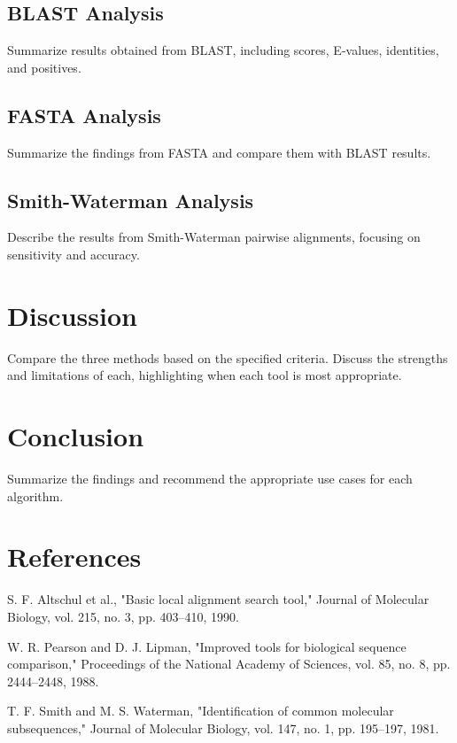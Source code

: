 \documentclass[a4paper,12pt]{article}
\begin{document}
\subsection{BLAST Analysis}
Summarize results obtained from BLAST, including scores, E-values, identities, and positives.

\subsection{FASTA Analysis}
Summarize the findings from FASTA and compare them with BLAST results.

\subsection{Smith-Waterman Analysis}
Describe the results from Smith-Waterman pairwise alignments, focusing on sensitivity and accuracy.

\section{Discussion}
Compare the three methods based on the specified criteria. Discuss the strengths and limitations of each, highlighting when each tool is most appropriate.

\section{Conclusion}
Summarize the findings and recommend the appropriate use cases for each algorithm.

\section{References}

\begin{thebibliography}{9}
    S. F. Altschul et al., "Basic local alignment search tool," Journal of Molecular Biology, vol. 215, no. 3, pp. 403–410, 1990.

    W. R. Pearson and D. J. Lipman, "Improved tools for biological sequence comparison," Proceedings of the National Academy of Sciences, vol. 85, no. 8, pp. 2444–2448, 1988.

    T. F. Smith and M. S. Waterman, "Identification of common molecular subsequences," Journal of Molecular Biology, vol. 147, no. 1, pp. 195–197, 1981.
\end{thebibliography}
\end{document}
